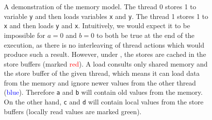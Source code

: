 \begin{figure}[th]
\begin{minipage}[b]{0.73\textwidth}
\begin{center}
  \end{center}
  \end{minipage}

  \caption{
  A demonstration of the \xtso memory model.
  The thread 0 stores 1 to variable \texttt{y} and then loads variables \texttt{x} and \texttt{y}.
  The thread 1 stores 1 to \texttt{x} and then loads \texttt{y} and \texttt{x}.
  Intuitively, we would expect it to be impossible for $a = 0$ and $b = 0$ to both be true at the end of the execution, as there is no interleaving of thread actions which would produce such a result.
  However, under \xtso, the stores are cached in the store buffers (marked \textcolor{red}{red}).
  A load consults only shared memory and the store buffer of the given thread, which means it can load data from the memory and ignore newer values from the other thread (\textcolor{blue}{blue}).
  Therefore \texttt{a} and \texttt{b} will contain old values from the memory.
  On the other hand, \texttt{c} and \texttt{d} will contain local values from the store buffers (locally read values are marked \textcolor{frombuf}{green}).
  }

  \label{fig:xtso}
\end{figure}

